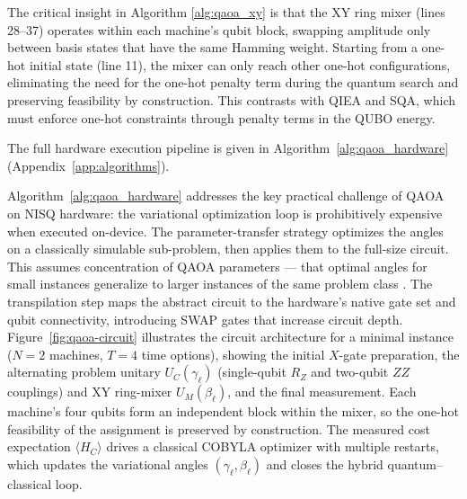The critical insight in Algorithm \ref{alg:qaoa_xy}  is that the XY ring mixer (lines 28–37) operates within each machine's qubit block, swapping amplitude only between basis states that have the same Hamming weight. Starting from a one-hot initial state (line 11), the mixer can only reach other one-hot configurations, eliminating the need for the one-hot penalty term during the quantum search and preserving feasibility by construction. This contrasts with QIEA and SQA, which must enforce one-hot constraints through penalty terms in the QUBO energy.

The full hardware execution pipeline is given in Algorithm~\ref{alg:qaoa_hardware} (Appendix~\ref{app:algorithms}).

Algorithm~\ref{alg:qaoa_hardware} addresses the key practical challenge of QAOA on NISQ hardware: the variational optimization loop is prohibitively expensive when executed on-device. The parameter-transfer strategy optimizes the angles on a classically simulable sub-problem, then applies them to the full-size circuit. This assumes concentration of QAOA parameters --- that optimal angles for small instances generalize to larger instances of the same problem class \cite{Brandao2018}. The transpilation step maps the abstract circuit to the hardware's native gate set and qubit connectivity, introducing SWAP gates that increase circuit depth.
Figure~\ref{fig:qaoa-circuit} illustrates the circuit architecture for a minimal instance ($N=2$ machines, $T=4$ time options), showing the initial $X$-gate preparation, the alternating problem unitary $U_C(\gamma_\ell)$ (single-qubit $R_Z$ and two-qubit $ZZ$ couplings) and XY ring-mixer $U_M(\beta_\ell)$, and the final measurement. Each machine's four qubits form an independent block within the mixer, so the one-hot feasibility of the assignment is preserved by construction. The measured cost expectation $\langle H_C\rangle$ drives a classical COBYLA optimizer with multiple restarts, which updates the variational angles $(\gamma_\ell,\beta_\ell)$ and closes the hybrid quantum--classical loop.

